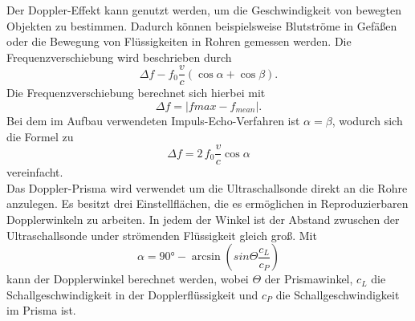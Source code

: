 Der Doppler-Effekt kann genutzt werden, um die Geschwindigkeit von bewegten Objekten zu bestimmen.
Dadurch können beispielsweise Blutströme in Gefäßen oder die Bewegung von Flüssigkeiten in Rohren gemessen werden.
Die Frequenzverschiebung wird beschrieben durch
\begin{equation*}
    Δf - f_0 \frac{v}{c} \left(\cos{α} + \cos{β}\right).
\end{equation*}
Die Frequenzverschiebung berechnet sich hierbei mit 
\begin{equation}\label{eq:fver}
    \Delta f = |f{max} - f_{mean}|.
\end{equation}
Bei dem im Aufbau verwendeten Impuls-Echo-Verfahren ist $α = β$, wodurch sich die Formel zu 
\begin{equation}\label{eq:Frequenzverschiebung}
    Δf = 2\, f_0 \frac{v}{c} \cos{α}
\end{equation}
vereinfacht.\\
Das Doppler-Prisma wird verwendet um die Ultraschallsonde direkt an die Rohre anzulegen.
Es besitzt drei Einstellflächen, die es ermöglichen in Reproduzierbaren Dopplerwinkeln zu arbeiten.
In jedem der Winkel ist der Abstand zwuschen der Ultraschallsonde under strömenden Flüssigkeit gleich groß.
Mit 
\begin{equation}\label{eq:Dopplerwinkel}
    α = 90° - \arcsin{\left(sin{Θ}\frac{c_L}{c_P}\right)}
\end{equation}
kann der Dopplerwinkel berechnet werden, wobei $Θ$ der Prismawinkel, $c_L$ die Schallgeschwindigkeit in der Dopplerflüssigkeit und $c_P$ die Schallgeschwindigkeit im Prisma ist.